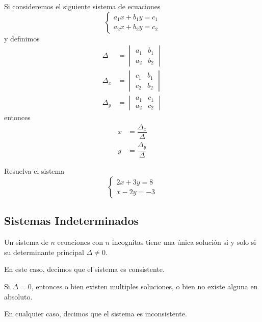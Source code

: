 	Si consideremos el siguiente sistema de ecuaciones
	\[
		\begin{cases}
			a_{1}x+b_{1}y=c_{1}\\
			a_{2}x+b_{2}y=c_{2}
		\end{cases}
	\]
	y definimos
	\begin{align*}
		\Delta&=\begin{vmatrix} a_{1} & b_{1} \\ a_{2} & b_{2} \end{vmatrix}\\
		\Delta_{x}&=\begin{vmatrix} c_{1} & b_{1} \\ c_{2} & b_{2} \end{vmatrix}\\
		\Delta_{y}&=\begin{vmatrix} a_{1} & c_{1} \\ a_{2} & c_{2} \end{vmatrix}
	\end{align*}
	entonces
	\[
		\label{spi:28.2}
		\begin{split}
			x&=\dfrac{\Delta_{x}}{\Delta}\\
			y&=\dfrac{\Delta_{y}}{\Delta}
		\end{split}
	\]




	\begin{resuelto}
		Resuelva el sistema
		$$\begin{cases}
			2x+3y=8\\
			x-2y=-3
		\end{cases}
		$$
	\end{resuelto}





\subsection{Sistemas Indeterminados}


	Un sistema de $ n $ ecuaciones con $ n $ incognitas tiene una única solución si y solo si su determinante principal $ \Delta \neq 0. $

	En este caso, decimos que el sistema es consistente.



	Si $ \Delta =0 $, entonces o bien existen multiples soluciones, o bien no existe alguna en absoluto.

	En cualquier caso, decimos que el sistema es inconsistente.



